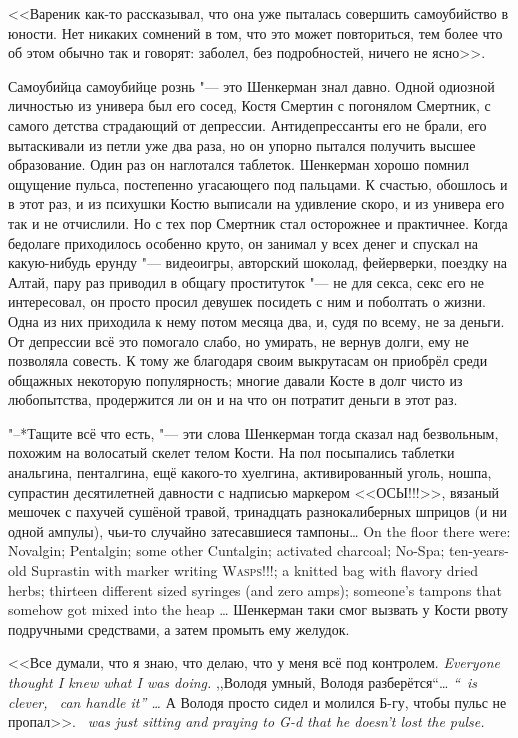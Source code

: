 <<Вареник как-то рассказывал, что она уже пыталась совершить самоубийство в юности.
Нет никаких сомнений в том, что это может повториться, тем более что об этом обычно так и говорят: заболел, без подробностей, ничего не ясно>>.

Самоубийца самоубийце рознь "--- это Шенкерман знал давно.
Одной одиозной личностью из универа был его сосед, Костя Смертин с погонялом Смертник, с самого детства страдающий от депрессии.
Антидепрессанты его не брали, его вытаскивали из петли уже два раза, но он упорно пытался получить высшее образование.
Один раз он наглотался таблеток.
Шенкерман хорошо помнил ощущение пульса, постепенно угасающего под пальцами.
К счастью, обошлось и в этот раз, и из психушки Костю выписали на удивление скоро, и из универа его так и не отчислили.
Но с тех пор Смертник стал осторожнее и практичнее.
Когда бедолаге приходилось особенно круто, он занимал у всех денег и спускал на какую-нибудь ерунду "--- видеоигры, авторский шоколад, фейерверки, поездку на Алтай, пару раз приводил в общагу проституток "--- не для секса, секс его не интересовал, он просто просил девушек посидеть с ним и поболтать о жизни.
Одна из них приходила к нему потом месяца два, и, судя по всему, не за деньги.
От депрессии всё это помогало слабо, но умирать, не вернув долги, ему не позволяла совесть.
К тому же благодаря своим выкрутасам он приобрёл среди общажных некоторую популярность;
многие давали Косте в долг чисто из любопытства, продержится ли он и на что он потратит деньги в этот раз.

"--*Тащите всё что есть, "--- эти слова Шенкерман тогда сказал над безвольным, похожим на волосатый скелет телом Кости.
{На пол посыпались таблетки анальгина, пенталгина, ещё какого-то хуелгина, активированный уголь, ношпа, супрастин десятилетней давности с надписью маркером <<ОСЫ!!!>>, вязаный мешочек с пахучей сушёной травой, тринадцать разнокалиберных шприцов (и ни одной ампулы), чьи-то случайно затесавшиеся тампоны\ldots{}}
{On the floor there were: Novalgin; Pentalgin; some other Cuntalgin; activated charcoal; No-Spa; ten-years-old Suprastin with marker writing \textsc{Wasps!!!}; a knitted bag with flavory dried herbs; thirteen different sized syringes (and zero amps); someone's tampons that somehow got mixed into the heap \ldots{}}
Шенкерман таки смог вызвать у Кости рвоту подручными средствами, а затем промыть ему желудок.

{<<Все думали, что я знаю, что делаю, что у меня всё под контролем.}
{\textit{Everyone thought I knew what I was doing.}}
{,,Володя умный, Володя разберётся``\ldots{}}
{\textit{``\Volodya\ is clever, \Volodya\ can handle it'' \ldots{}}}
{А Володя просто сидел и молился Б-гу, чтобы пульс не пропал>>.}
{\textit{\Volodya\ was just sitting and praying to G-d that he doesn't lost the pulse.}}

